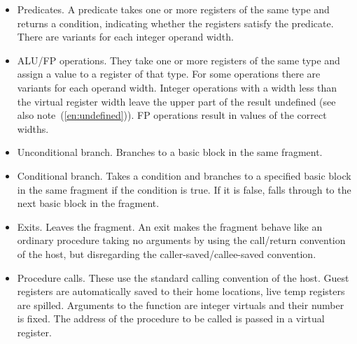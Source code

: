 \documentclass{article}
\newcommand{\enref}[1]{(\ref{#1})}
\begin{document}
\begin{itemize}
\item Predicates.  A predicate takes one or more registers of the same
    type and returns a condition, indicating whether the registers
    satisfy the predicate.  There are variants for each integer
    operand width.

\item ALU/FP operations.  They take one or more registers of the same
    type and assign a value to a register of that type.  For some
    operations there are variants for each
    operand width.  Integer operations with a width less than the
    virtual register width leave the upper part of the result
    undefined (see also note~\enref{en:undefined}).  FP operations
    result in values of the correct widths.

\item Unconditional branch.  Branches to a basic block in the same
    fragment.

\item Conditional branch.  Takes a condition and branches to a specified
    basic block in the same fragment if the condition is true.  If it
    is false, falls through to the next basic block in the fragment.

\item Exits.  Leaves the fragment.  An exit makes the fragment behave
    like an ordinary procedure taking no arguments by using the
    call/return convention of the host, but disregarding the
    caller-saved/callee-saved convention.

\item Procedure calls.  These use the standard calling convention of the
    host.  Guest registers are automatically saved to their home
    locations, live temp registers are spilled.  Arguments to the
    function are integer virtuals and their number is fixed.  The address of the
    procedure to be called is passed in a virtual
    register.


\end{itemize}
\end{document}
